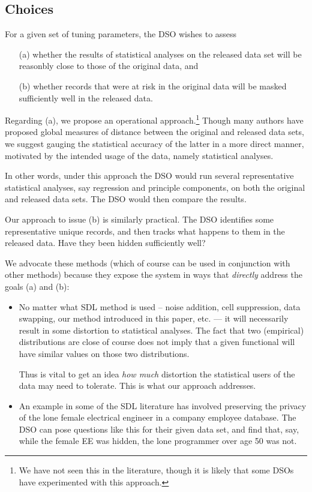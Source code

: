 \documentclass[11pt]{article}
\begin{document}
\subsection{Choices}

For a given set of tuning parameters, the DSO wishes to assess

\begin{itemize}

\item [(a)] whether the results of statistical  analyses on the released
data set will be reasonbly close to those of the original data, and 

\item [(b)]
whether records that were at risk in the original data will be masked 
sufficiently well in the released data.

\end{itemize}

Regarding (a), we propose an operational approach.\footnote{We have not
seen this in the literature, though it is likely that some DSOs have
experimented with this approach.}  Though many authors have proposed
global measures of distance between the original and released data sets,
we suggest gauging the statistical accuracy of the latter in a more
direct manner, motivated by the intended usage of the data, namely
statistical analyses.

In other words, under this approach the DSO would run several
representative statistical analyses, say regression and principle
components, on both the original and released data sets.  The DSO would
then compare the results. 

Our approach to issue (b) is similarly practical.  The DSO identifies
some representative unique records, and then tracks what happens to
them in the released data.  Have they been hidden sufficiently well?

We advocate these methods (which of course can be used in conjunction
with other methods) because they expose the system in ways that {\it
directly} address the goals (a) and (b):

\begin{itemize}

\item No matter what SDL method is used -- noise addition, cell
suppression, data swapping, our method introduced in this paper, etc.
--- it will necessarily result in some distortion to statistical analyses.
The fact that two (empirical) distributions are close  of course does
not imply that a given functional will have similar values on those two
distributions.

Thus is vital to get an idea {\it how much} distortion the statistical
users of the data may need to tolerate.  This is what our approach
addresses.

\item An example in some of the SDL literature has involved preserving
the privacy of the lone female electrical engineer in a company
employee database.  The DSO can pose questions like this for their given
data set, and find that, say,  while the female EE was hidden, the lone
programmer over age 50 was not.

\end{itemize}
\end{document}
